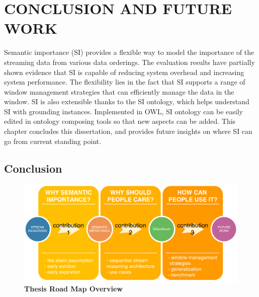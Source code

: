  
\chapter{CONCLUSION AND FUTURE WORK}
Semantic importance (SI) provides a flexible way to model the importance of the streaming data from various data orderings.
The evaluation results have partially shown evidence that SI is capable of reducing system overhead and increasing system performance. 
The flexibility lies in the fact that SI supports a range of window management strategies that can efficiently manage the data in the window. 
SI is also extensible thanks to the SI ontology, which helps understand SI with grounding instances. 
Implemented in OWL, SI ontology can be easily edited in ontology composing tools so that new aspects can be added. 
This chapter concludes this dissertation, and provides future insights on where SI can go from current standing point. 
%
\section{Conclusion}

\begin{figure}[!htbp]
	\centering
    \includegraphics[width=5in]{img/7-trm.pdf}
    \caption{\textbf{Thesis Road Map Overview}}
    \label{fig:7-trm}
\end{figure}
%
